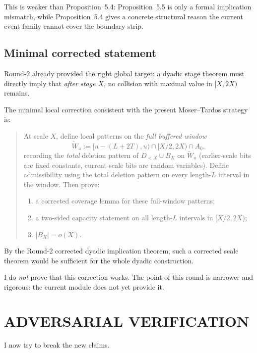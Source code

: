 This is weaker than Proposition~5.4: Proposition~5.5 is only a formal implication mismatch, while Proposition~5.4 gives a concrete structural reason the current event family cannot cover the boundary strip.

\subsection{Minimal corrected statement}

Round-2 already provided the right global target: a dyadic stage theorem must directly imply that \emph{after stage $X$}, no collision with maximal value in $[X,2X)$ remains.

The minimal local correction consistent with the present Moser--Tardos strategy is:

\begin{quote}
At scale $X$, define local patterns on the \emph{full buffered window}
\[
\widetilde W_u:=[u-(L+2T),u)\cap [X/2,2X)\cap A_0,
\]
recording the \emph{total} deletion pattern of $D_{<X}\cup B_X$ on $\widetilde W_u$ (earlier-scale bits are fixed constants, current-scale bits are random variables). Define admissibility using the total deletion pattern on every length-$L$ interval in the window. Then prove:
\begin{enumerate}
\item a corrected coverage lemma for these full-window patterns;
\item a two-sided capacity statement on all length-$L$ intervals in $[X/2,2X)$;
\item $|B_X|=o(X)$.
\end{enumerate}
\end{quote}

By the Round-2 corrected dyadic implication theorem, such a corrected scale theorem would be sufficient for the whole dyadic construction.

I do \emph{not} prove that this correction works. The point of this round is narrower and rigorous: the current module does not yet provide it.

\section{ADVERSARIAL VERIFICATION}

I now try to break the new claims.


